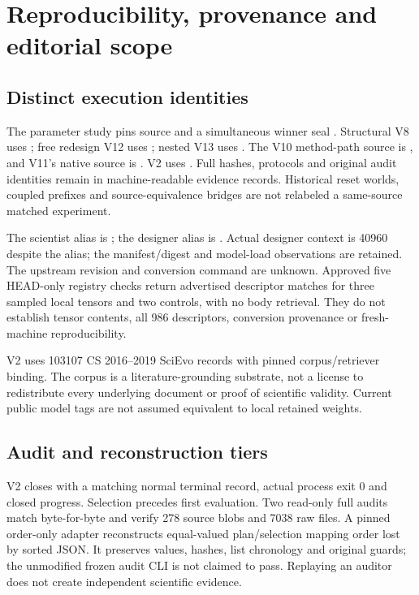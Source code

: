 \section{Reproducibility, provenance and editorial scope}
\label{app:reproduction}
\subsection{Distinct execution identities}
The parameter study pins source  and a simultaneous winner
seal . Structural V8 uses ; free redesign
V12 uses ; nested V13 uses .
The V10 method-path source is , and V11's native source
is . V2 uses . Full hashes, protocols and
original audit identities remain in machine-readable evidence records.
Historical reset worlds, coupled prefixes and source-equivalence bridges are
not relabeled a same-source matched experiment.

The scientist alias is ; the designer alias is
. Actual designer context is 40960 despite the
alias; the manifest/digest and model-load observations are retained. The upstream
revision and conversion command are unknown. Approved five HEAD-only registry
checks return advertised descriptor matches for three sampled local tensors
and two controls, with no body retrieval. They do not establish tensor contents,
all 986 descriptors, conversion provenance or fresh-machine reproducibility.

V2 uses 103107 CS 2016--2019 SciEvo records with pinned corpus/retriever binding.
The corpus is a literature-grounding substrate, not a license to redistribute
every underlying document or proof of scientific validity. Current public
model tags are not assumed equivalent to local retained weights.

\subsection{Audit and reconstruction tiers}
V2 closes with a matching normal terminal record, actual process exit 0 and
closed progress. Selection precedes first evaluation. Two read-only full audits
match byte-for-byte and verify 278 source blobs and 7038 raw files. A pinned
order-only adapter reconstructs equal-valued plan/selection mapping order lost
by sorted JSON. It preserves values, hashes, list chronology and original guards;
the unmodified frozen audit CLI is not claimed to pass. Replaying an auditor
does not create independent scientific evidence.

